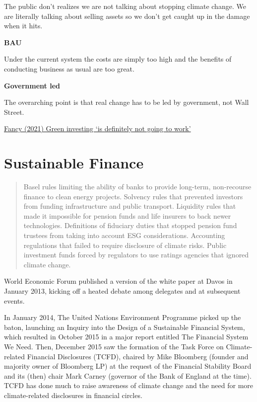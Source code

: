 \documentclass[
]{book}
\begin{document}
The public don't realizes we are not talking about stopping climate change.
We are literally talking about selling assets so we don't get caught
up in the damage when it hits.

\textbf{BAU}

Under the current system the costs are simply too high and
the benefits of conducting business as usual are too great.

\textbf{Government led}

The overarching point is that real change has to be led by government, not Wall Street.

\href{https://www.theguardian.com/business/2021/mar/30/tariq-fancy-environmentally-friendly-green-investing}{Fancy (2021) Green investing `is definitely not going to work'}

\hypertarget{sustainable-finance}{%
\section{Sustainable Finance}\label{sustainable-finance}}

\begin{quote}
Basel rules limiting the ability of banks to provide long-term, non-recourse finance to clean energy projects. Solvency rules that prevented investors from funding infrastructure and public transport. Liquidity rules that made it impossible for pension funds and life insurers to back newer technologies. Definitions of fiduciary duties that stopped pension fund trustees from taking into account ESG considerations. Accounting regulations that failed to require disclosure of climate risks. Public investment funds forced by regulators to use ratings agencies that ignored climate change.
\end{quote}

World Economic Forum published a version of the white paper at Davos in January 2013, kicking off a heated debate among delegates and at subsequent events.

In January 2014, The United Nations Environment Programme picked up the baton, launching an Inquiry into the Design of a Sustainable Financial System, which resulted in October 2015 in a major report entitled The Financial System We Need. Then, December 2015 saw the formation of the Task Force on Climate-related Financial Disclosures (TCFD), chaired by Mike Bloomberg (founder and majority owner of Bloomberg LP) at the request of the Financial Stability Board and its (then) chair Mark Carney (governor of the Bank of England at the time). TCFD has done much to raise awareness of climate change and the need for more climate-related disclosures in financial circles.
\end{document}
